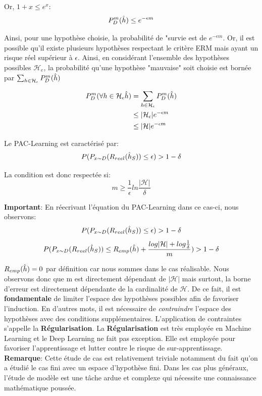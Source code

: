 \noindent Or, $1+x \leq e^x$:
$$P_D^m(\Hat{h}) \leq e^{-\epsilon m}$$

\noindent Ainsi, pour une hypothèse choisie, la probabilité de "survie est de $e^{-\epsilon m}$. Or, il est possible qu'il existe plusieurs hypothèses respectant le critère ERM mais ayant un risque réel supérieur à $\epsilon$. Ainsi, en considérant l'ensemble des hypothèses possibles $\mathcal{H}_{e}$, la probabilité qu'une hypothèse "mauvaise" soit choisie est bornée par $\sum_{h \in \mathcal{H}_\epsilon}P_D^m(\Hat{h})$

\begin{align*}
P_D^m(\forall h \in \mathcal{H}_\epsilon\Hat{h}) &= \sum_{h \in \mathcal{H}_\epsilon}P_D^m(\Hat{h})\\
&\leq |\mathcal{H}_{\epsilon}|e^{-\epsilon m}\\
&\leq |\mathcal{H}|e^{-\epsilon m}
\end{align*}

\noindent Le PAC-Learning est caractérisé par:
$$P(P_{x \sim D} (R_{reel}(\Hat{h}_S)) \leq \epsilon) > 1-\delta$$

\noindent La condition est donc respectée si:
$$m \geq \frac{1}{\epsilon}ln\frac{|\mathcal{H}|}{\delta}$$

\noindent \textbf{Important}: En réecrivant l'équation du PAC-Learning dans ce cas-ci, nous observons:
$$P(P_{x \sim D} (R_{reel}(\Hat{h}_S)) \leq \epsilon) > 1-\delta$$
$$P(P_{x \sim D} (R_{reel}(\Hat{h}_S)) \leq R_{emp}(\Hat{h})+\frac{log|\mathcal{H}|+log\frac{1}{\delta}}{m}) > 1-\delta$$

\noindent $R_{emp}(\Hat{h})=0$ par définition car nous sommes dans le cas réalisable. Nous observons donc que m est directement dépendant de $|\mathcal{H}|$ mais surtout, la borne d'erreur est directement dépendante de la cardinalité de $\mathcal{H}$. De ce fait, il est \textbf{fondamentale} de limiter l'espace des hypothèses possibles afin de favoriser l'induction. En d'autres mots, il est nécessaire de \textit{contraindre} l'espace des hypothèses avec des conditions supplémentaires. L'application de contraintes s'appelle la \textbf{Régularisation}. La \textbf{Régularisation} est très employée en Machine Learning et le Deep Learning ne fait pas exception. Elle est employée pour favoriser l'apprentissage et lutter contre le risque de sur-apprentissage.\\

\noindent \textbf{Remarque}: Cette étude de cas est relativement triviale notamment du fait qu'on a étudié le cas fini avec un espace d'hypothèse fini. Dans les cas plus généraux, l'étude de modèle est une tâche ardue et complexe qui nécessite une connaissance mathématique poussée.

